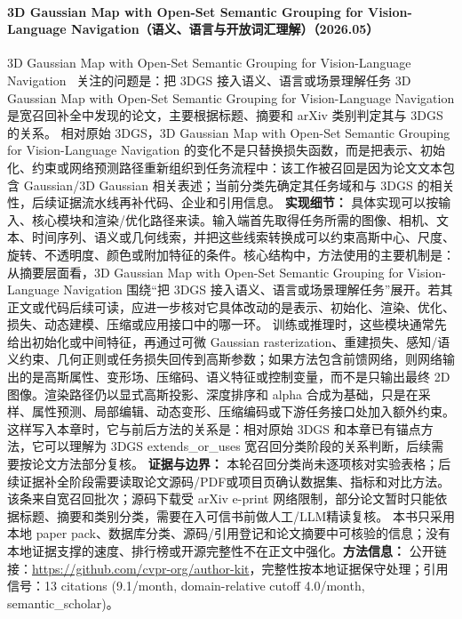 \paragraph{3D Gaussian Map with Open-Set Semantic Grouping for Vision-Language Navigation（语义、语言与开放词汇理解）（2026.05）}
3D Gaussian Map with Open-Set Semantic Grouping for Vision-Language Navigation~\cite{2605_26500} 关注的问题是：把 3DGS 接入语义、语言或场景理解任务 3D Gaussian Map with Open-Set Semantic Grouping for Vision-Language Navigation 是宽召回补全中发现的论文，主要根据标题、摘要和 arXiv 类别判定其与 3DGS 的关系。
相对原始 3DGS，3D Gaussian Map with Open-Set Semantic Grouping for Vision-Language Navigation 的变化不是只替换损失函数，而是把表示、初始化、约束或网络预测路径重新组织到任务流程中：该工作被召回是因为论文文本包含 Gaussian/3D Gaussian 相关表述；当前分类先确定其任务域和与 3DGS 的相关性，后续证据流水线再补代码、企业和引用信息。
\textbf{实现细节：} 具体实现可以按输入、核心模块和渲染/优化路径来读。输入端首先取得任务所需的图像、相机、文本、时间序列、语义或几何线索，并把这些线索转换成可以约束高斯中心、尺度、旋转、不透明度、颜色或附加特征的条件。核心结构中，方法使用的主要机制是：从摘要层面看，3D Gaussian Map with Open-Set Semantic Grouping for Vision-Language Navigation 围绕“把 3DGS 接入语义、语言或场景理解任务”展开。若其正文或代码后续可读，应进一步核对它具体改动的是表示、初始化、渲染、优化、损失、动态建模、压缩或应用接口中的哪一环。 训练或推理时，这些模块通常先给出初始化或中间特征，再通过可微 Gaussian rasterization、重建损失、感知/语义约束、几何正则或任务损失回传到高斯参数；如果方法包含前馈网络，则网络输出的是高斯属性、变形场、压缩码、语义特征或控制变量，而不是只输出最终 2D 图像。渲染路径仍以显式高斯投影、深度排序和 alpha 合成为基础，只是在采样、属性预测、局部编辑、动态变形、压缩编码或下游任务接口处加入额外约束。这样写入本章时，它与前后方法的关系是：相对原始 3DGS 和本章已有锚点方法，它可以理解为 3DGS extends\_or\_uses 宽召回分类阶段的关系判断，后续需要按论文方法部分复核。
\textbf{证据与边界：} 本轮召回分类尚未逐项核对实验表格；后续证据补全阶段需要读取论文源码/PDF或项目页确认数据集、指标和对比方法。 该条来自宽召回批次；源码下载受 arXiv e-print 网络限制，部分论文暂时只能依据标题、摘要和类别分类，需要在入可信书前做人工/LLM精读复核。 本书只采用本地 paper pack、数据库分类、源码/引用登记和论文摘要中可核验的信息；没有本地证据支撑的速度、排行榜或开源完整性不在正文中强化。\textbf{方法信息：} 公开链接：\url{https://github.com/cvpr-org/author-kit}，完整性按本地证据保守处理；引用信号：13 citations (9.1/month, domain-relative cutoff 4.0/month, semantic\_scholar)。
